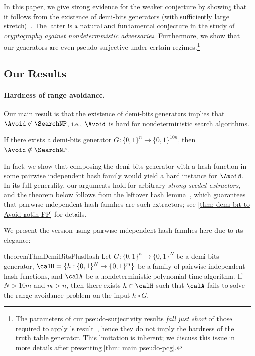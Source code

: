 In this paper, we give strong evidence for the weaker conjecture by showing that it follows from the existence of demi-bits generators (with sufficiently large stretch)~\cite{Rudich97}. The latter is a natural and fundamental conjecture in the study of \emph{cryptography against nondeterministic adversaries}. Furthermore, we show that our generators are even pseudo-surjective under certain regimes.\footnote{The parameters of our pseudo-surjectivity results \emph{fall just short} of those required to apply \Krajicek's result~\cite{Krajicek04}, hence they do not imply the hardness of the truth table generator. This limitation is inherent; we discuss this issue in more details after presenting \autoref{thm: main pseudo-pcg}.} %



\subsection{Our Results}
\paragraph{Hardness of range avoidance.} Our main result is that the existence of demi-bits generators implies that $\Avoid\not\in\SearchNP$, i.e., $\Avoid$ is hard for nondeterministic search algorithms. %

\begin{theorem}[Main]\label{thm: main demi-bit to Avoid notin FP}
	If there exists a demi-bits generator $G: \{0, 1\}^n \to \{0, 1\}^{10n}$, then $\Avoid \notin \SearchNP$. %
\end{theorem}

In fact, we show that composing the demi-bits generator with a hash function in some pairwise independent hash family would yield a hard instance for $\Avoid$. In its full generality, our arguments hold for arbitrary \emph{strong seeded extractors}, and the theorem below follows from the leftover hash lemma~\cite{ILL89}, which guarantees that pairwise independent hash families are such extractors; see \autoref{thm: demi-bit to Avoid notin FP} for details. %



We present the version using pairwise independent hash families here due to its elegance:


\begin{restatable}{theorem}{ThmDemiBitsPlusHash}\label{thm: intro demi-bits plus hash}
    Let $G: \{0, 1\}^n \to \{0, 1\}^N$ be a demi-bits generator, $\calH = \{h: \{0, 1\}^N \to \{0, 1\}^m\}$ be a family of pairwise independent hash functions, and $\calA$ be a nondeterministic polynomial-time algorithm. If $N > 10m$ and $m > n$, then there exists $h\in \calH$ such that $\calA$ fails to solve the range avoidance problem on the input $h\circ G$.
\end{restatable}





